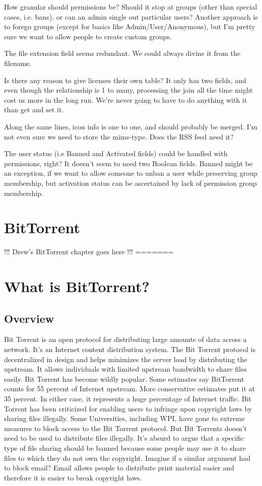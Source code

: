 \documentclass[a4paper,12pt]{report}
\begin{document}
How granular should permissions be? Should it stop at groups (other than special cases, i.e. bans), or can an admin single out particular users? Another approach is to forego groups (except for basics like Admin/User/Anonymous), but I’m pretty sure we want to allow people to create custom groups.

The file extension field seems redundant. We could always divine it from the filename.

Is there any reason to give licenses their own table? It only has two fields, and even though the relationship is 1 to many, processing the join all the time might cost us more in the long run. We’re never going to have to do anything with it than get and set it.

Along the same lines, icon info is one to one, and should probably be merged. I’m not even sure we need to store the mime-type. Does the RSS feed need it? 

The user status (i.e Banned and Activated fields) could be handled with permissions, right? It doesn’t seem to need two Boolean fields. Banned might be an exception, if we want to allow someone to unban a user while preserving group membership, but activation status can be ascertained by lack of permission group membership.

\chapter{BitTorrent}
!!! Drew's BitTorrent chapter goes here !!!
=======
\chapter{What is BitTorrent?}

\section{Overview}
Bit Torrent is an open protocol for distributing large amounts of data across a network. It’s an Internet content distribution system. The Bit Torrent protocol is decentralized in design and helps minimizes the server load by distributing the upstream. It allows individuals with limited upstream bandwidth to share files easily. 
Bit Torrent has become wildly popular. Some estimates say BitTorrent counts for 55 percent of Internet upstream. More conservative estimates put it at 35 percent. In either case, it represents a huge percentage of Internet traffic.
Bit Torrent has been criticized for enabling users to infringe upon copyright laws by sharing files illegally. Some Universities, including WPI, have gone to extreme measures to block access to the Bit Torrent protocol. But Bit Torrents doesn’t need to be used to distribute files illegally. It’s absurd to argue that a specific type of file sharing should be banned because some people may use it to share files to which they do not own the copyright. Imagine if a similar argument had to block email? Email allows people to distribute print material easier and therefore it is easier to break copyright laws. 
\end{document}
